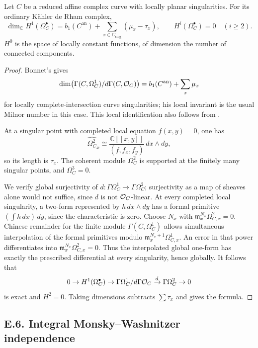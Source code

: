 \begin{theorem}\label{thm:DE-curves}
Let $C$ be a reduced affine complex curve with locally planar singularities.  For its ordinary K\"ahler de Rham complex,
\[
 \dim_{\mathbb C}H^1(\Omega_C^\bullet)
       =b_1(C^{\mathrm{an}})+\sum_{x\in C_{\mathrm{sing}}}(\mu_x-\tau_x),
 \qquad H^i(\Omega_C^\bullet)=0\quad(i\geq2).
\]
$H^0$ is the space of locally constant functions, of dimension the number of connected components.
\end{theorem}
\begin{proof}
Bonnet's \cite[Theorem~1.2]{Bonnet2006} gives
\[
 \dim\bigl(\Gamma(C,\Omega_C^1)/d\Gamma(C,\mathcal O_C)\bigr)
       =b_1(C^{\mathrm{an}})+\sum_x\mu_x
\]
for locally complete-intersection curve singularities; his local invariant is the usual Milnor number in this case.  This local identification also follows from \cite[Theorem~2.2(1)]{DimcaGreuel2018}.

At a singular point with completed local equation $f(x,y)=0$, one has
\[
 \widehat{\Omega_C^2}_x\cong
 \frac{\mathbb C[[x,y]]}{(f,f_x,f_y)}\,dx\wedge dy,
\]
so its length is $\tau_x$.  The coherent module $\Omega_C^2$ is supported at the finitely many singular points, and $\Omega_C^3=0$.

We verify global surjectivity of $d:\Gamma\Omega_C^1\to\Gamma\Omega_C^2$; surjectivity as a map of sheaves alone would not suffice, since $d$ is not $\mathcal O_C$-linear.  At every completed local singularity, a two-form represented by $h\,dx\wedge dy$ has a formal primitive $(\int h\,dx)\,dy$, since the characteristic is zero.  Choose $N_x$ with $\mathfrak m_x^{N_x}\Omega_{C,x}^2=0$.  Chinese remainder for the finite module $\Gamma(C,\Omega_C^1)$ allows simultaneous interpolation of the formal primitives modulo $\mathfrak m_x^{N_x+1}\Omega_{C,x}^1$.  An error in that power differentiates into $\mathfrak m_x^{N_x}\Omega_{C,x}^2=0$.  Thus the interpolated global one-form has exactly the prescribed differential at every singularity, hence globally.  It follows that
\[
 0\to H^1(\Omega_C^\bullet)\to
 \Gamma\Omega_C^1/d\Gamma\mathcal O_C\xrightarrow{d}\Gamma\Omega_C^2\to0
\]
is exact and $H^2=0$.  Taking dimensions subtracts $\sum\tau_x$ and gives the formula.
\end{proof}

\subsection{E.6. Integral Monsky--Washnitzer independence}

